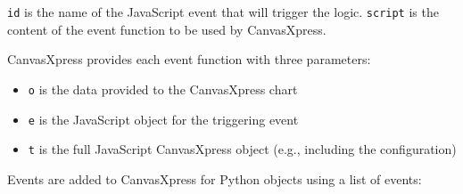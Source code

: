 \documentclass[
  letterpaper,
  DIV=11,
  numbers=noendperiod]{scrartcl}
\providecommand{\tightlist}{%
  \setlength{\itemsep}{0pt}\setlength{\parskip}{0pt}}\usepackage{longtable,booktabs,array}
\begin{document}
\texttt{id} is the name of the JavaScript event that will trigger the
logic. \texttt{script} is the content of the event function to be used
by CanvasXpress.

CanvasXpress provides each event function with three parameters:

\begin{itemize}
\tightlist
\item
  \texttt{o} is the data provided to the CanvasXpress chart
\item
  \texttt{e} is the JavaScript object for the triggering event
\item
  \texttt{t} is the full JavaScript CanvasXpress object (e.g., including
  the configuration)
\end{itemize}

Events are added to CanvasXpress for Python objects using a list of
events:
\end{document}

